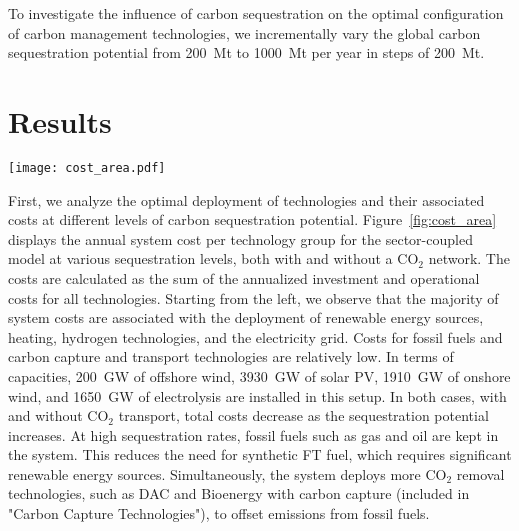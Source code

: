 \documentclass[conference]{IEEEtran}
\newcommand{\carbon}{CO$_2$ }
\newcommand{\hydrogen}{H$_2$ }
\begin{document}
To investigate the influence of carbon sequestration on the optimal configuration of carbon management technologies, we incrementally vary the global carbon sequestration potential from 200~Mt to 1000~Mt per year in steps of 200~Mt.

\section{Results}
\label{sec:results}

\begin{figure*}[hbt]
    \centering
    \texttt{[image: cost\_area.pdf]}
    \caption[short]{Total annual system cost for the sector-coupled system with different levels of carbon sequestration potential, with (left) and without (right) \carbon network. When increasing the annual sequestration of from 200~Mt to 1000~Mt, the system cost reduce up to 10\% in case of a network with \carbon transport. Due to an increased flexibility from fossil carriers with subsequent sequestration, the need for FT synthesis and \hydrogen electrolysis and the corresponding renewable power supply is reduced.
    }
    \label{fig:cost_area}
\end{figure*}

First, we analyze the optimal deployment of technologies and their associated costs at different levels of carbon sequestration potential. Figure~\ref{fig:cost_area} displays the annual system cost per technology group for the sector-coupled model at various sequestration levels, both with and without a \carbon network. The costs are calculated as the sum of the annualized investment and operational costs for all technologies. Starting from the left, we observe that the majority of system costs are associated with the deployment of renewable energy sources, heating, hydrogen technologies, and the electricity grid. Costs for fossil fuels and carbon capture and transport technologies are relatively low. In terms of capacities, 200~GW of offshore wind, 3930~GW of solar PV, 1910~GW of onshore wind, and 1650~GW of electrolysis are installed in this setup.
In both cases, with and without \carbon transport, total costs decrease as the sequestration potential increases. At high sequestration rates, fossil fuels such as gas and oil are kept in the system. This reduces the need for synthetic FT fuel, which requires significant renewable energy sources. Simultaneously, the system deploys more \carbon removal technologies, such as DAC and Bioenergy with carbon capture (included in "Carbon Capture Technologies"), to offset emissions from fossil fuels.
\end{document}

